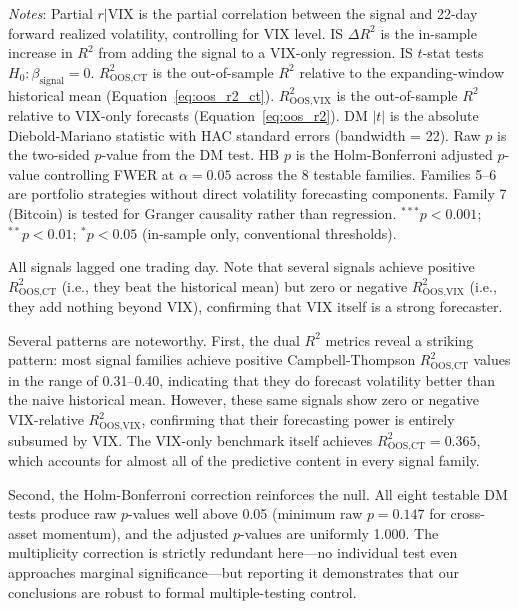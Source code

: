 \documentclass[12pt,a4paper]{article}
\begin{document}
\begin{table}[H]
\begin{threeparttable}
\begin{tablenotes}
\item \textit{Notes}: Partial $r|\text{VIX}$ is the partial correlation between the signal and 22-day forward realized volatility, controlling for VIX level. IS $\Delta R^2$ is the in-sample increase in $R^2$ from adding the signal to a VIX-only regression. IS $t$-stat tests $H_0: \beta_{\text{signal}} = 0$. $R^2_{\text{OOS,CT}}$ is the \citet{campbell2008} out-of-sample $R^2$ relative to the expanding-window historical mean (Equation~\ref{eq:oos_r2_ct}). $R^2_{\text{OOS,VIX}}$ is the out-of-sample $R^2$ relative to VIX-only forecasts (Equation~\ref{eq:oos_r2}). DM $|t|$ is the absolute Diebold-Mariano statistic with \citet{newey1987} HAC standard errors (bandwidth = 22). Raw $p$ is the two-sided $p$-value from the DM test. HB $p$ is the Holm-Bonferroni adjusted $p$-value controlling FWER at $\alpha = 0.05$ across the 8 testable families. Families 5--6 are portfolio strategies without direct volatility forecasting components. Family 7 (Bitcoin) is tested for Granger causality rather than regression. $^{***}p<0.001$; $^{**}p<0.01$; $^{*}p<0.05$ (in-sample only, conventional thresholds).
\item All signals lagged one trading day. Note that several signals achieve positive $R^2_{\text{OOS,CT}}$ (i.e., they beat the historical mean) but zero or negative $R^2_{\text{OOS,VIX}}$ (i.e., they add nothing beyond VIX), confirming that VIX itself is a strong forecaster.
\end{tablenotes}
\end{threeparttable}
\end{table}

Several patterns are noteworthy. First, the dual $R^2$ metrics reveal a striking pattern: most signal families achieve positive Campbell-Thompson $R^2_{\text{OOS,CT}}$ values in the range of 0.31--0.40, indicating that they do forecast volatility better than the naive historical mean. However, these same signals show zero or negative VIX-relative $R^2_{\text{OOS,VIX}}$, confirming that their forecasting power is entirely subsumed by VIX. The VIX-only benchmark itself achieves $R^2_{\text{OOS,CT}} = 0.365$, which accounts for almost all of the predictive content in every signal family.

Second, the Holm-Bonferroni correction reinforces the null. All eight testable DM tests produce raw $p$-values well above 0.05 (minimum raw $p = 0.147$ for cross-asset momentum), and the adjusted $p$-values are uniformly 1.000. The multiplicity correction is strictly redundant here---no individual test even approaches marginal significance---but reporting it demonstrates that our conclusions are robust to formal multiple-testing control.
\end{document}
